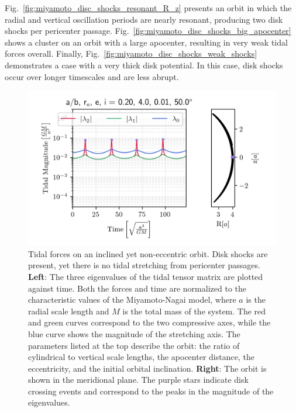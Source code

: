             Fig.~\ref{fig:miyamoto_disc_shocks_resonant_R_z} presents an orbit in which the radial and vertical oscillation periods are nearly resonant, producing two disk shocks per pericenter passage. Fig.~\ref{fig:miyamoto_disc_shocks_big_apocenter} shows a cluster on an orbit with a large apocenter, resulting in very weak tidal forces overall. Finally, Fig.~\ref{fig:miyamoto_disc_shocks_weak_shocks} demonstrates a case with a very thick disk potential. In this case, disk shocks occur over longer timescales and are less abrupt.

            \begin{figure}
                \centering
                \includegraphics[width=.9\linewidth]{images/miyamoto_disc_shocks_ab_rp_e_i_0.20_4.0_0.01_50.0.png}
                \caption{Tidal forces on an inclined yet non-eccentric orbit. Disk shocks are present, yet there is no tidal stretching from pericenter passages. \textbf{Left}: The three eigenvalues of the tidal tensor matrix are plotted against time. Both the forces and time are normalized to the characteristic values of the Miyamoto-Nagai model, where $a$ is the radial scale length and $M$ is the total mass of the system. The red and green curves correspond to the two compressive axes, while the blue curve shows the magnitude of the stretching axis. The parameters listed at the top describe the orbit: the ratio of cylindrical to vertical scale lengths, the apocenter distance, the eccentricity, and the initial orbital inclination. \textbf{Right}: The orbit is shown in the meridional plane. The purple stars indicate disk crossing events and correspond to the peaks in the magnitude of the eigenvalues. }
                \label{fig:miyamoto_disc_shocks_circular_inclined_orbit}
            \end{figure}

